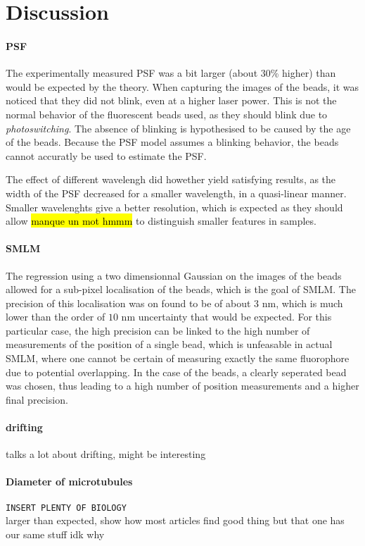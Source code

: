 \section{Discussion}
\paragraph{PSF}
The experimentally measured PSF was a bit larger (about $30$\% higher) than would be expected by the theory. When capturing the images of the beads, it was noticed that they did not blink, even at a higher laser power. This is not the normal behavior of the fluorescent beads used, as they should blink due to \emph{photoswitching}. The absence of blinking is hypothesised to be caused by the age of the beads. Because the PSF model assumes a blinking behavior, the beads cannot accuratly be used to estimate the PSF.

The effect of different wavelengh did howether yield satisfying results, as the width of the PSF decreased for a smaller wavelength, in a quasi-linear manner. Smaller wavelenghts give a better resolution, which is expected as they should allow \hl{manque un mot hmmm} to distinguish smaller features in samples.

\paragraph{SMLM}
The regression using a two dimensionnal Gaussian on the images of the beads allowed for a sub-pixel localisation of the beads, which is the goal of SMLM. The precision of this localisation was on found to be of about $3$ nm, which is much lower than the order of $10$ nm uncertainty that would be expected. For this particular case, the high precision can be linked to the high number of measurements of the position of a single bead, which is unfeasable in actual SMLM, where one cannot be certain of measuring exactly the same fluorophore due to potential overlapping. In the case of the beads, a clearly seperated bead was chosen, thus leading to a high number of position measurements and a higher final precision.

\paragraph{drifting}
\cite{martens_raw_2022} talks a lot about drifting, might be interesting

\paragraph{Diameter of microtubules}
\verb|INSERT PLENTY OF BIOLOGY| \\
larger than expected, show how most articles find good thing but that one has our same stuff idk why


